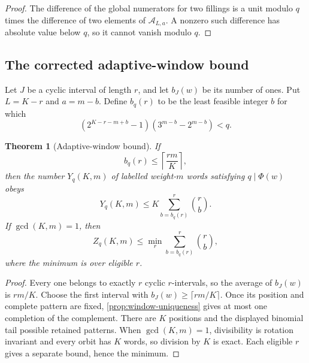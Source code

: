 \documentclass[11pt]{amsart}
\numberwithin{equation}{section}
\newtheorem{theorem}{Theorem}[section]
\newcommand{\A}{\mathcal A}
\begin{document}
\begin{proof}
The difference of the global numerators for two fillings is a unit modulo $q$ times the difference of two elements of $\A_{L,a}$.  A nonzero such difference has absolute value below $q$, so it cannot vanish modulo $q$.
\end{proof}

\subsection{The corrected adaptive-window bound}

Let $J$ be a cyclic interval of length $r$, and let $b_J(w)$ be its number of ones.  Put $L=K-r$ and $a=m-b$.  Define $b_q(r)$ to be the least feasible integer $b$ for which
\begin{equation}\label{eq:bqr-def}
(2^{K-r-m+b}-1)(3^{m-b}-2^{m-b})<q.
\end{equation}

\begin{theorem}[Adaptive-window bound]\label{thm:adaptive-window}
If
\[
b_q(r)\le\left\lceil\frac{rm}{K}\right\rceil,
\]
then the number $Y_q(K,m)$ of labelled weight-$m$ words satisfying $q\mid\Phi(w)$ obeys
\begin{equation}\label{eq:adaptive-labelled}
Y_q(K,m)
\le
K\sum_{b=b_q(r)}^r\binom rb.
\end{equation}
If $\gcd(K,m)=1$, then
\begin{equation}\label{eq:adaptive-Z}
Z_q(K,m)
\le
\min_r\sum_{b=b_q(r)}^r\binom rb,
\end{equation}
where the minimum is over eligible $r$.
\end{theorem}

\begin{proof}
Every one belongs to exactly $r$ cyclic $r$-intervals, so the average of $b_J(w)$ is $rm/K$.  Choose the first interval with $b_J(w)\ge\lceil rm/K\rceil$.  Once its position and complete pattern are fixed, \cref{prop:window-uniqueness} gives at most one completion of the complement.  There are $K$ positions and the displayed binomial tail possible retained patterns.  When $\gcd(K,m)=1$, divisibility is rotation invariant and every orbit has $K$ words, so division by $K$ is exact.  Each eligible $r$ gives a separate bound, hence the minimum.
\end{proof}
\end{document}
